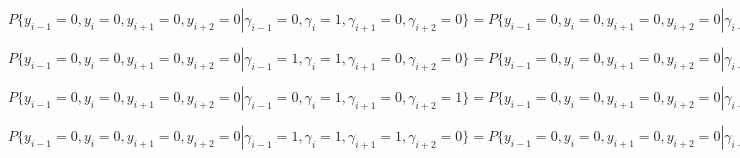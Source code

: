 \documentclass[a4paper,12pt]{article}
\theoremstyle{plain}
\begin{document}
$P\{y_{i-1} = 0, y_i = 0, y_{i+1} = 0, y_{i+2} = 0 |\gamma_{i-1}=0,\gamma_i=1,\gamma_{i+1}=0, \gamma_{i+2} = 0\}=P\{y_{i-1} = 0, y_i = 0, y_{i+1} = 0, y_{i+2} = 0 |\gamma_{i-1}=0,\gamma_i=0,\gamma_{i+1}=1, \gamma_{i+2} = 0\} =\frac{(1+\varepsilon)(1+\varepsilon^2)}{16};$\newline

$P\{y_{i-1} = 0, y_i = 0, y_{i+1} = 0, y_{i+2} = 0 |\gamma_{i-1}=1,\gamma_i=1,\gamma_{i+1}=0, \gamma_{i+2} = 0\}=P\{y_{i-1} = 0, y_i = 0, y_{i+1} = 0, y_{i+2} = 0 |\gamma_{i-1}=0,\gamma_i=0,\gamma_{i+1}=0, \gamma_{i+2} = 1\}=P\{y_{i-1} = 0, y_i = 0, y_{i+1} = 0, y_{i+2} = 0 |\gamma_{i-1}=1,\gamma_i=0,\gamma_{i+1}=0, \gamma_{i+2} = 1\}=P\{y_{i-1} = 0, y_i = 0, y_{i+1} = 0, y_{i+2} = 0 |\gamma_{i-1}=0,\gamma_i=0,\gamma_{i+1}=1, \gamma_{i+2} = 1\}=\frac{1+\varepsilon}{16};$\newline

$P\{y_{i-1} = 0, y_i = 0, y_{i+1} = 0, y_{i+2} = 0 |\gamma_{i-1}=0,\gamma_i=1,\gamma_{i+1}=0, \gamma_{i+2} = 1\}=P\{y_{i-1} = 0, y_i = 0, y_{i+1} = 0, y_{i+2} = 0 |\gamma_{i-1}=1,\gamma_i=0,\gamma_{i+1}=1, \gamma_{i+2} = 0\}=\frac{1+\varepsilon^2}{16};$\newline

$P\{y_{i-1} = 0, y_i = 0, y_{i+1} = 0, y_{i+2} = 0 |\gamma_{i-1}=1,\gamma_i=1,\gamma_{i+1}=1, \gamma_{i+2} = 0\}=P\{y_{i-1} = 0, y_i = 0, y_{i+1} = 0, y_{i+2} = 0 |\gamma_{i-1}=1,\gamma_i=1,\gamma_{i+1}=0, \gamma_{i+2} = 1\}=P\{y_{i-1} = 0, y_i = 0, y_{i+1} = 0, y_{i+2} = 0 |\gamma_{i-1}=1,\gamma_i=0,\gamma_{i+1}=1, \gamma_{i+2} = 1\}=P\{y_{i-1} = 0, y_i = 0, y_{i+1} = 0, y_{i+2} = 0 |\gamma_{i-1}=0,\gamma_i=1,\gamma_{i+1}=1, \gamma_{i+2} =P\{y_{i-1} = 0, y_i = 0, y_{i+1} = 0, y_{i+2} = 0 |\gamma_{i-1}=1,\gamma_i=1,\gamma_{i+1}=1, \gamma_{i+2}= 1\}=\frac{1}{16};$\newline
\end{document}
